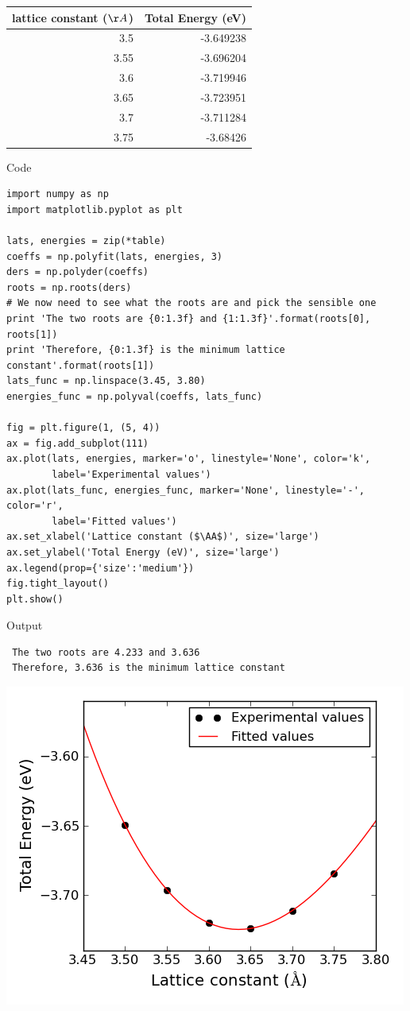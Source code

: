 \documentclass[11pt]{article}
\begin{document}
\begin{center}
\begin{tabular}{rr}
 lattice constant ($\AA$)  &  Total Energy (eV)  \\
\hline
                      3.5  &          -3.649238  \\
                     3.55  &          -3.696204  \\
                      3.6  &          -3.719946  \\
                     3.65  &          -3.723951  \\
                      3.7  &          -3.711284  \\
                     3.75  &           -3.68426  \\
\end{tabular}
\end{center}



Code

\begin{verbatim}
import numpy as np
import matplotlib.pyplot as plt

lats, energies = zip(*table)
coeffs = np.polyfit(lats, energies, 3)
ders = np.polyder(coeffs)
roots = np.roots(ders)
# We now need to see what the roots are and pick the sensible one
print 'The two roots are {0:1.3f} and {1:1.3f}'.format(roots[0], roots[1])
print 'Therefore, {0:1.3f} is the minimum lattice constant'.format(roots[1])
lats_func = np.linspace(3.45, 3.80)
energies_func = np.polyval(coeffs, lats_func)

fig = plt.figure(1, (5, 4))
ax = fig.add_subplot(111)
ax.plot(lats, energies, marker='o', linestyle='None', color='k',
        label='Experimental values')
ax.plot(lats_func, energies_func, marker='None', linestyle='-', color='r',
        label='Fitted values')
ax.set_xlabel('Lattice constant ($\AA$)', size='large')
ax.set_ylabel('Total Energy (eV)', size='large')
ax.legend(prop={'size':'medium'})
fig.tight_layout()
plt.show()
\end{verbatim}

Output
\begin{verbatim}
 The two roots are 4.233 and 3.636
 Therefore, 3.636 is the minimum lattice constant
\end{verbatim}

\includegraphics[width=.9\linewidth]{./hw1_data-fitting.png}
\end{document}
